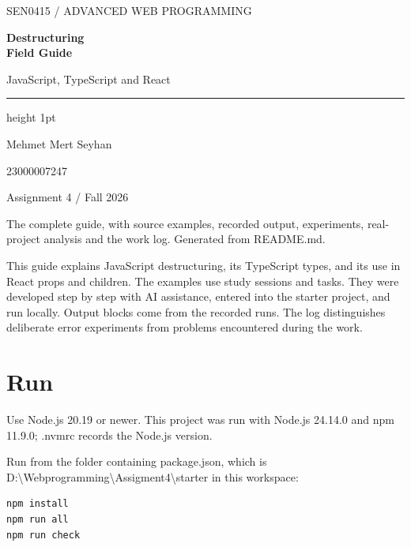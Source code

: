 \documentclass[10pt,a4paper]{article}
\begin{document}
\hypersetup{pageanchor=false}
\begin{titlepage}
\vspace*{20mm}
{\sffamily\large\color{accent}SEN0415 / ADVANCED WEB PROGRAMMING\par}
\vspace{10mm}
{\sffamily\Huge\bfseries\color{ink}Destructuring\\[3mm]Field Guide\par}
\vspace{7mm}
{\Large JavaScript, TypeScript and React\par}
\vspace{12mm}
{\color{rulecolor}\hrule height 1pt}
\vspace{9mm}
{\large Mehmet Mert Seyhan\par}
{\large 23000007247\par}
\vspace{4mm}
{\sffamily Assignment 4 / Fall 2026\par}
\vfill
The complete guide, with source examples, recorded output, experiments,
real-project analysis and the work log. Generated from README.md.
\end{titlepage}
\hypersetup{pageanchor=true}
\tableofcontents
\clearpage
{}

This guide explains JavaScript destructuring, its TypeScript types, and its use in React props and children. The examples use study sessions and tasks. They were developed step by step with AI assistance, entered into the starter project, and run locally. Output blocks come from the recorded runs. The log distinguishes deliberate error experiments from problems encountered during the work.

\section{Run}

Use Node.js 20.19 or newer. This project was run with Node.js 24.14.0 and npm 11.9.0; .nvmrc records the Node.js version.


Run from the folder containing package.json, which is D:\textbackslash{}Webprogramming\textbackslash{}Assigment4\textbackslash{}starter in this workspace:

\begin{lstlisting}[language={}]
npm install
npm run all
npm run check
\end{lstlisting}
\end{document}
